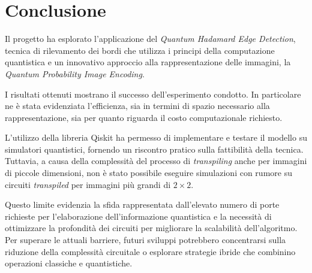 \section{Conclusione}\label{sec:conclusione}

Il progetto ha esplorato l'applicazione del \emph{Quantum Hadamard Edge
Detection}, tecnica di rilevamento dei bordi che utilizza i principi della
computazione quantistica e un innovativo approccio alla rappresentazione delle
immagini, la \emph{Quantum Probability Image Encoding}.

I risultati ottenuti mostrano il successo dell'esperimento condotto. In
particolare ne è stata evidenziata l'efficienza, sia in termini di spazio
necessario alla rappresentazione, sia per quanto riguarda il costo
computazionale richiesto.

L’utilizzo della libreria Qiskit ha permesso di implementare e testare il
modello su simulatori quantistici, fornendo un riscontro pratico sulla
fattibilità della tecnica. Tuttavia, a causa della complessità del processo di
\emph{transpiling} anche per immagini di piccole dimensioni, non è stato
possibile eseguire simulazioni con rumore su circuiti \emph{transpiled} per
immagini più grandi di $2\times2$. 

Questo limite evidenzia la sfida rappresentata dall’elevato numero di porte
richieste per l’elaborazione dell’informazione quantistica e la necessità di
ottimizzare la profondità dei circuiti per migliorare la scalabilità
dell’algoritmo. Per superare le attuali barriere, futuri sviluppi potrebbero
concentrarsi sulla riduzione della complessità circuitale o esplorare strategie
ibride che combinino operazioni classiche e quantistiche.
